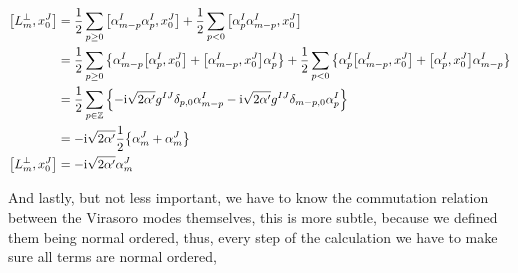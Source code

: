 \begin{align*}
    \comm{L_m^\perp}{x_0^J}&=\frac12\sum\limits_{p\geq0}\comm{\alpha_{m-p}^I\alpha_p^I}{x_0^J}+\frac12\sum\limits_{p<0}\comm{\alpha_{p}^I\alpha_{m-p}^I}{x_0^J}\\
    &=\frac12\sum\limits_{p\geq0}\qty{\alpha_{m-p}^I\comm{\alpha_p^I}{x_0^J}+\comm{\alpha_{m-p}^I}{x_0^J}\alpha_p^I}+\frac12\sum\limits_{p<0}\qty{\alpha_{p}^I\comm{\alpha_{m-p}^I}{x_0^J}+\comm{\alpha_{p}^I}{x_0^J}\alpha_{m-p}^I}\\
    &=\frac12\sum\limits_{p\in\mathbb Z}\qty{-\im\sqrt{2\alpha'}g^{IJ}\delta_{p,0}\alpha_{m-p}^I-\im\sqrt{2\alpha'}g^{IJ}\delta_{m-p,0}\alpha_p^I}\\
    &=-\im\sqrt{2\alpha'}\frac12\qty{\alpha_{m}^J+\alpha_m^J}\\
    \comm{L_m^\perp}{x_0^J}&=-\im\sqrt{2\alpha'}\alpha_m^J
\end{align*}

And lastly, but not less important, we have to know the commutation relation between the Virasoro modes themselves, this is more subtle, 
because we defined them being normal ordered, thus, every step of the calculation we have to make sure all terms are normal ordered,

